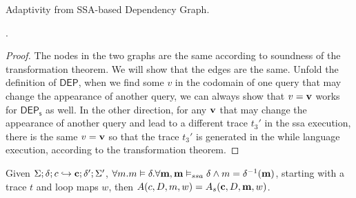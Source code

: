 \documentclass[a4paper,11pt]{article}
\begin{document}
\begin{defn}
Adaptivity from SSA-based Dependency Graph.
\\
\end{defn}


\begin{thm}.
\\
\end{thm}
%
\begin{proof}
 The nodes in the two graphs are the same according to soundness of the transformation theorem. We will show that the edges are the same. Unfold the definition of $\mathsf{DEP}$, when we find some $v$ in the codomain of one query that may change the appearance of another query,  we can always show that $v = \mathbf{{v}}$ works for $\mathsf{DEP_s}$ as well. In the other direction, for any $\mathbf{{v}}$ that may change the appearance of another query and lead to a different trace $t_3'$ in the ssa execution, there is the same $v = \mathbf{{v}}$ so that the trace $t_3'$ is generated in the while language execution, according to the transformation theorem.  
\end{proof}

\begin{coro}
Given $\Sigma; \delta ; c \hookrightarrow \mathbf{{c}} ; \delta';\Sigma' $, $\forall m. m \vDash \delta. \forall \mathbf{{m}}, \mathbf{{m}} \vDash_{ssa} \delta \land m = \delta^{-1}(\mathbf{{m}})$, starting with a trace $t$ and loop maps $w$, then $A(c,D,m,w) = A_s(\mathbf{{c}},D,\mathbf{{m}},w) $.
\end{coro}

\clearpage
\end{document}
